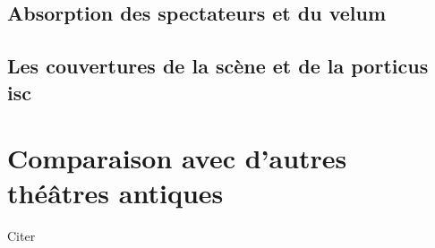 



\section{Absorption des spectateurs et du \gls{velum}}
\cite[p.212]{jouhaneau}
\section{Les couvertures de la scène et de la \gls{porticus isc}}

\newpage

\chapter{Comparaison avec d'autres théâtres antiques}
\minitoc
\newpage

Citer  \cite[p.25]{rindel}

